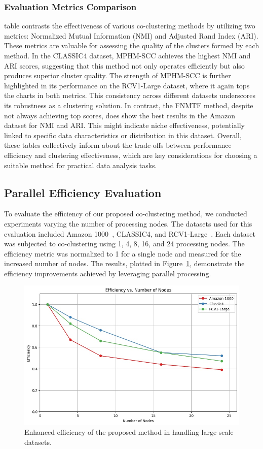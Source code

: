 \documentclass[journal]{IEEEtran}
\renewcommand{\cite}[1]{~\autocite{#1}}
\begin{document}
\subsubsection{Evaluation Metrics Comparison}
  table contrasts the effectiveness of various co-clustering methods by utilizing two metrics: Normalized Mutual Information (NMI) and Adjusted Rand Index (ARI). These metrics are valuable for assessing the quality of the clusters formed by each method. In the CLASSIC4 dataset, MPHM-SCC achieves the highest NMI and ARI scores, suggesting that this method not only operates efficiently but also produces superior cluster quality. The strength of MPHM-SCC is further highlighted in its performance on the RCV1-Large dataset, where it again tops the charts in both metrics. This consistency across different datasets underscores its robustness as a clustering solution. In contrast, the FNMTF method, despite not always achieving top scores, does show the best results in the Amazon dataset for NMI and ARI. This might indicate niche effectiveness, potentially linked to specific data characteristics or distribution in this dataset. Overall, these tables collectively inform about the trade-offs between performance efficiency and clustering effectiveness, which are key considerations for choosing a suitable method for practical data analysis tasks.

\subsection{Parallel Efficiency Evaluation}
To evaluate the efficiency of our proposed co-clustering method, we conducted experiments varying the number of processing nodes. The datasets used for this evaluation included Amazon 1000\cite{ni2019JustifyingRecommendationsUsing}, CLASSIC4, and RCV1-Large\cite{lewis2004Rcv1NewBenchmark}. Each dataset was subjected to co-clustering using 1, 4, 8, 16, and 24 processing nodes. The efficiency metric was normalized to 1 for a single node and measured for the increased number of nodes. The results, plotted in Figure~\ref{fig:efficiency}, demonstrate the efficiency improvements achieved by leveraging parallel processing.

\begin{figure}[htbp]
  \centering
  \includegraphics[width=0.8\linewidth]{efficiency.jpg}
  \caption{Enhanced efficiency of the proposed method in handling large-scale datasets.}
  \label{fig:efficiency}
\end{figure}
\end{document}

